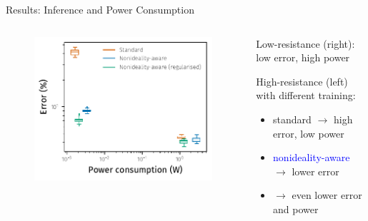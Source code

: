 \documentclass[
  aspectratio=169,
  hyperref={breaklinks=true, colorlinks, citecolor=blue, linkcolor=blue, urlcolor=blue},
]{beamer}
\begin{document}
\begin{frame}{Results: Inference and Power Consumption}
  \begin{columns}
    \pause{}

    \begin{column}{0.45\linewidth}
      \begin{figure}
        \includegraphics[width=\linewidth]{figures/PDF/iv-nonlinearity-inference.pdf}
      \end{figure}
    \end{column}
    \begin{column}{0.55\linewidth}
      \pause{}

      Low-resistance (right): low error, high power

      \pause{}
      \bigskip

      High-resistance (left) with different training:\pause{}
      \begin{itemize}[<+->]
        \item \alert{standard} $\rightarrow$ high error, low power
        \item \textcolor{blue}{nonideality-aware} $\rightarrow$ lower error
        \item {} $\rightarrow$ even lower error and power
      \end{itemize}
    \end{column}
  \end{columns}
\end{frame}
\end{document}
